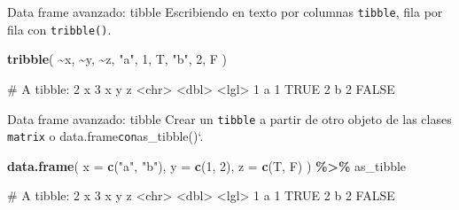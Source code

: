\documentclass[
  ignorenonframetext,
  aspectratio=169]{beamer}
\newenvironment{Shaded}{\begin{snugshade}}{\end{snugshade}}
\newcommand{\AttributeTok}[1]{\textcolor[rgb]{0.13,0.29,0.53}{#1}}
\newcommand{\DecValTok}[1]{\textcolor[rgb]{0.00,0.00,0.81}{#1}}
\newcommand{\FunctionTok}[1]{\textcolor[rgb]{0.13,0.29,0.53}{\textbf{#1}}}
\newcommand{\NormalTok}[1]{#1}
\newcommand{\SpecialCharTok}[1]{\textcolor[rgb]{0.81,0.36,0.00}{\textbf{#1}}}
\newcommand{\StringTok}[1]{\textcolor[rgb]{0.31,0.60,0.02}{#1}}
\let\oldverbatim\verbatim
\let\endoldverbatim\endverbatim
\renewenvironment{verbatim}{\tiny\oldverbatim}{\endoldverbatim}
\begin{document}
\begin{frame}[fragile]{Data frame avanzado: tibble}
\label{data-frame-avanzado-tibble-1}
Escribiendo en texto por columnas \texttt{tibble}, fila por fila con
\texttt{tribble()}.

\begin{Shaded}
\begin{Highlighting}[]
\FunctionTok{tribble}\NormalTok{(}
  \SpecialCharTok{\textasciitilde{}}\NormalTok{x, }\SpecialCharTok{\textasciitilde{}}\NormalTok{y, }\SpecialCharTok{\textasciitilde{}}\NormalTok{z,}
  \StringTok{"a"}\NormalTok{, }\DecValTok{1}\NormalTok{, T,}
  \StringTok{"b"}\NormalTok{, }\DecValTok{2}\NormalTok{, F}
\NormalTok{)}
\end{Highlighting}
\end{Shaded}

\begin{verbatim}
# A tibble: 2 x 3
  x         y z    
  <chr> <dbl> <lgl>
1 a         1 TRUE 
2 b         2 FALSE
\end{verbatim}
\end{frame}

\begin{frame}[fragile]{Data frame avanzado: tibble}
\label{data-frame-avanzado-tibble-2}
Crear un \texttt{tibble} a partir de otro objeto de las clases
\texttt{matrix} o data.frame\texttt{con}as\_tibble()`.

\begin{Shaded}
\begin{Highlighting}[]
\FunctionTok{data.frame}\NormalTok{(}
  \AttributeTok{x =} \FunctionTok{c}\NormalTok{(}\StringTok{"a"}\NormalTok{, }\StringTok{"b"}\NormalTok{),}
  \AttributeTok{y =} \FunctionTok{c}\NormalTok{(}\DecValTok{1}\NormalTok{, }\DecValTok{2}\NormalTok{),}
  \AttributeTok{z =} \FunctionTok{c}\NormalTok{(T, F)}
\NormalTok{) }\SpecialCharTok{\%\textgreater{}\%} 
\NormalTok{as\_tibble}
\end{Highlighting}
\end{Shaded}

\begin{verbatim}
# A tibble: 2 x 3
  x         y z    
  <chr> <dbl> <lgl>
1 a         1 TRUE 
2 b         2 FALSE
\end{verbatim}
\end{frame}
\end{document}
